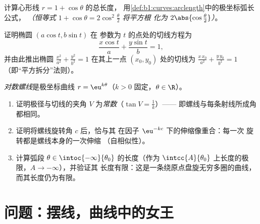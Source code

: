 \begin{exercise}[$\star\star$]\label{exo:b1:curves:10}
计算心形线 $r = 1 + \cos\theta$ 的总长度，
用\cref{def:b1:curves:arclength}中的极坐标弧长公式，
\emph{（恒等式 $1 + \cos\theta = 2\cos^2\frac\theta2$ 将平方根
化为 $2\abs{\cos\frac\theta2}$）}。
\end{exercise}

\begin{exercise}[$\star\star$]\label{exo:b1:curves:11}
证明椭圆 $(a\cos t, b\sin t)$ 在
参数为 $t$ 的点处的切线方程为
\[
\frac{x\cos t}{a} + \frac{y\sin t}{b} = 1 ,
\]
并由此推出椭圆 $\frac{x^2}{a^2} + \frac{y^2}{b^2} = 1$
在其上一点 $(x_0, y_0)$ 处的切线为 $\frac{x\,x_0}{a^2} +
\frac{y\,y_0}{b^2} = 1$（即“平方拆分”法则）。
\end{exercise}

\begin{exercise}[$\star\star\star$]\label{exo:b1:curves:12}
\emph{对数螺线}是极坐标曲线 $r =
\eu^{k\theta}$（$k > 0$ 固定，$\theta \in \R$）。
\begin{enumerate}
  \item 证明极径与切线的夹角 $V$
        为\emph{常数}（$\tan V = \frac1k$）——
        即螺线与每条射线所成角都相同。
  \item 证明将螺线旋转角 $c$ 后，恰与其
        在因子 $\eu^{-kc}$ 下的伸缩像重合：每一次
        旋转都是螺线本身的一次伸缩
        （自相似性）。
  \item 计算弧段 $\theta \in
        \intoc{-\infty}{\theta_0}$ 的长度（作为
        $\intcc{A}{\theta_0}$ 上长度的极限，$A \to -\infty$），并验证其
        长度有限：这是一条绕原点盘旋无穷多圈的曲线，
        而其长度仍为有限。
\end{enumerate}
\end{exercise}

\section{问题：摆线，曲线中的女王}

